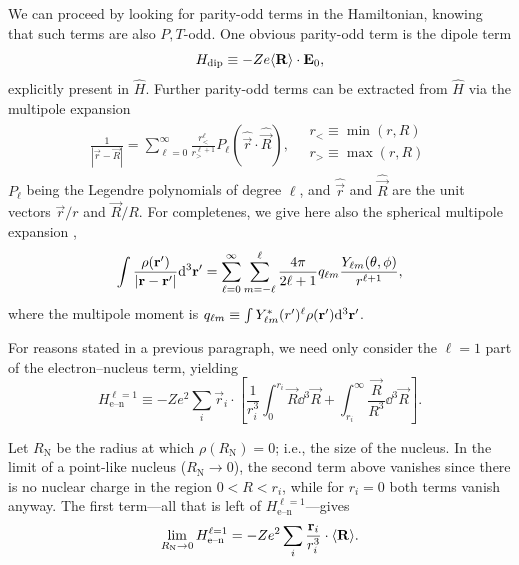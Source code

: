 We can proceed by looking for parity-odd terms in the Hamiltonian, knowing that
such terms are also $P,T$-odd. One obvious parity-odd term is the dipole term
%
\begin{equation}
\label{obvious}
H_\text{dip}\equiv
-Ze\langle \mathbf{R}\rangle\cdot\mathbf{E}_0,
\end{equation}
%
explicitly present in $\hat H$. Further parity-odd terms can be extracted from
$\hat H$ via the multipole expansion \cite[eqn~3.38]{jackson1998classical}
%
\begin{align}
    \label{truemultipole}
    \frac{1}{|\vec r-\vec R|}
    =\sum\limits_{\ell=0}^\infty
    \frac{r_<^\ell}{r^{\ell+1}_>}
    P_\ell({\hat{\vec r}\cdot\hat{\vec R}}),
    \quad
    \begin{matrix}
        r_<\equiv\min(r,R)\\
        r_>\equiv\max(r,R)\\
    \end{matrix}
\end{align}
%
$P_\ell$ being the Legendre polynomials of degree $\ell$, and $\hat{\vec r}$ and
$\hat{\vec R}$ are the unit vectors $\vec r/r$ and $\vec R/R$. For completenes,
we give here also the spherical multipole expansion
\cite[eqn~4.1]{jackson1998classical},
%
\begin{equation}
    \label{sphericalMultipole}
    \int\frac{\rho(\mathbf{r}')}{|\mathbf{r}-\mathbf{r}'|}\mathrm{d}^3\mathbf{r}'=
    \sum\limits_{\ell=0}^\infty
    \sum\limits_{m=-\ell}^\ell
    \frac{4\pi}{2\ell+1}
    q_{\ell m}
    \frac{Y_{\ell m}(\theta,\phi)}{r^{\ell+1}},
\end{equation}
%
where the multipole moment is $q_{\ell m}\equiv\int Y^*_{\ell
m}(r')^\ell\rho(\mathbf{r}')\mathrm{d}^3\mathbf{r}'$.

For reasons stated in a previous paragraph, we need only consider the $\ell=1$ part of the electron--nucleus term, yielding
%
\begin{equation}
    H_\text{e--n}^{\ell=1}\equiv
    \label{l1dipole}
    -Ze^2\sum_i\vec r_i\cdot\left[
        \frac{1}{r_i^3}\int_0^{r_i}\vec R\dd^3\vec R
        +\int_{r_i}^\infty\frac{\vec R}{R^3}\dd^3\vec R
    \right].
\end{equation}

Let $R_\text{N}$ be the radius at which $\rho(R_\text{N})=0$; i.e., the size of
the nucleus. In the limit of a point-like nucleus ($R_\text{N}\to0$), the second term above
vanishes since there is no nuclear charge in the region $0<R<r_i$, while for
$r_i=0$ both terms vanish anyway. The first term---all that is left of
$H_\text{e--n}^{\ell=1}$---gives
%
\begin{equation}
    \label{Henl1small}
\lim\limits_{R_\text{N}\to0}
H_\text{e--n}^{\ell=1}
=
-Ze^2
\sum\limits_i
\frac{\mathbf{r}_i}{r_i^3}
\cdot
\langle \mathbf{R}\rangle.
\end{equation}

